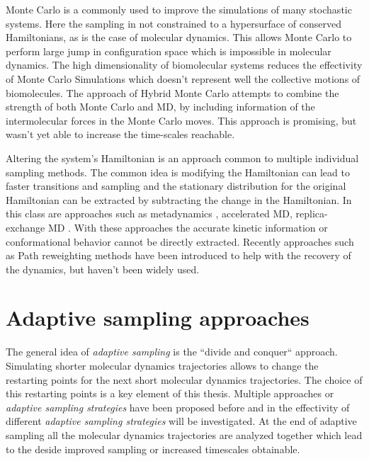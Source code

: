 Monte Carlo is a commonly used to improve the simulations of many stochastic systems. Here the sampling in not constrained to a hypersurface of conserved Hamiltonians, as is the case of molecular dynamics. This allows Monte Carlo to perform large jump in configuration space which is impossible in molecular dynamics. The high dimensionality of biomolecular systems reduces the effectivity of Monte Carlo Simulations which doesn't represent well the collective motions of biomolecules. The approach of Hybrid Monte Carlo attempts to combine the strength of both Monte Carlo and MD, by including information of the intermolecular forces in the Monte Carlo moves. This approach is promising, but wasn't yet able to increase the time-scales reachable. 


Altering the system's Hamiltonian is an approach common to multiple individual sampling methods. The common idea is modifying the Hamiltonian can lead to faster transitions and sampling and the stationary distribution for the original Hamiltonian can be extracted by subtracting the change in the Hamiltonian. In this class are approaches such as metadynamics \cite{laio2008metadynamics}, accelerated MD\cite{hamelberg2004accelerated}, replica-exchange MD \cite{sugita1999replica}. With these approaches the accurate kinetic information or conformational behavior cannot be directly extracted. Recently approaches such as Path reweighting methods \cite{pathreweight1, pathreweight2, pathreweight3, pathreweight4} have been introduced to help with the recovery of the dynamics, but haven't been widely used.

\section{\label{sec:intro2}Adaptive sampling approaches}

The general idea of \emph{adaptive sampling} is the ``divide and conquer`` approach. Simulating shorter molecular dynamics trajectories allows to change the restarting points for the next short molecular dynamics trajectories. The choice of this restarting points is a key element of this thesis. Multiple approaches or \emph{adaptive sampling strategies} have been proposed before \cite{singhal2005error, bowman2010enhanced,
weber2011characterization, Fabritiis-2014, preto2014fast, doerr2016htmd,
AdaptivePELE-Lecina2017, EvolutionCoupling-Shamsi2017, FAST-Bowman-2015, 
Strategies-erros-reduce, plattner2017complete} and in the effectivity of different \emph{adaptive sampling strategies} will be investigated. At the end of adaptive sampling all the molecular dynamics trajectories are analyzed together which lead to the deside improved sampling or increased timescales obtainable. 

